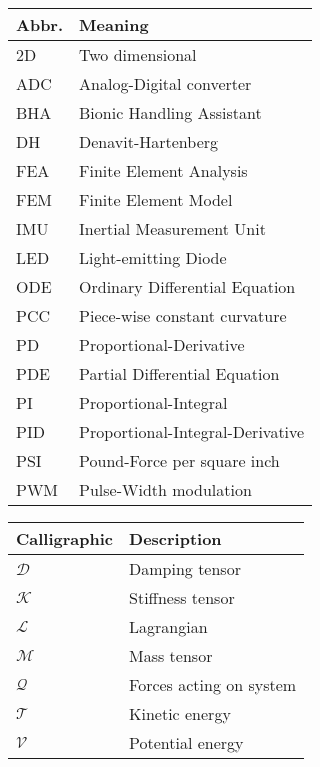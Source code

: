 \begin{spacing}{0.9}
\begin{multicols}{2}
\begin{table}[H]
\centering
    \begin{tabular}{p{1.5cm} p{5cm}} \hline
    \textbf{Abbr.}    &   \textbf{Meaning }\\ \hline
    2D       & Two dimensional \\
    ADC     &  Analog-Digital converter\\
    BHA    &  Bionic Handling Assistant\\
    DH    &  Denavit-Hartenberg\\
    FEA     &  Finite Element Analysis \\
    FEM     &  Finite Element Model \\
    IMU    & Inertial Measurement Unit \\
    LED   & Light-emitting Diode \\
    ODE   & Ordinary Differential Equation \\
    PCC   & Piece-wise constant curvature \\
    PD    & Proportional-Derivative \\
    PDE    & Partial Differential Equation \\
    PI   & Proportional-Integral \\
    PID   & Proportional-Integral-Derivative\\
    PSI    & Pound-Force per square inch\\
    PWM    & Pulse-Width modulation\\  \hline
    \end{tabular}
\end{table}



\begin{table}[H]
\centering
    \begin{tabular}{p{2.5cm} p{4cm}} \hline
    \textbf{Calligraphic}    &   \textbf{Description }\\ \hline

    $\mathcal{D}$     &  Damping tensor \\
    $\mathcal{K}$     &  Stiffness tensor \\
    $\mathcal{L}$     &  Lagrangian \\
    $\mathcal{M}$     &  Mass tensor \\
    $\mathcal{Q}$     &  Forces acting on system \\
    $\mathcal{T}$     &  Kinetic energy \\
    $\mathcal{V}$     &  Potential energy \\ \hline


\end{tabular}
\end{table}
\end{multicols}
\end{spacing}
